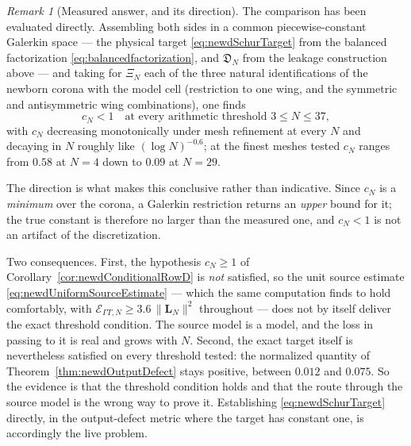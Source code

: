 \documentclass[11pt]{amsart}
\theoremstyle{definition}
\theoremstyle{remark}
\newtheorem{remark}[theorem]{Remark}
\begin{document}
\begin{remark}[Measured answer, and its direction]
\label{rem:newdTransferMeasured}
The comparison has been evaluated directly.  Assembling both sides in a common
piecewise-constant Galerkin space --- the physical target
\eqref{eq:newdSchurTarget} from the balanced factorization
\eqref{eq:balancedfactorization}, and \(\mathfrak D_N\) from the leakage
construction above --- and taking for \(\Xi_N\) each of the three natural
identifications of the newborn corona with the model cell (restriction to one
wing, and the symmetric and antisymmetric wing combinations), one finds
\[
 c_N<1\quad\text{at every arithmetic threshold }3\le N\le37,
\]
with \(c_N\) decreasing monotonically under mesh refinement at every \(N\) and
decaying in \(N\) roughly like \((\log N)^{-0.6}\); at the finest meshes tested
\(c_N\) ranges from \(0.58\) at \(N=4\) down to \(0.09\) at \(N=29\).

The direction is what makes this conclusive rather than indicative.  Since
\(c_N\) is a \emph{minimum} over the corona, a Galerkin restriction returns an
\emph{upper} bound for it; the true constant is therefore no larger than the
measured one, and \(c_N<1\) is not an artifact of the discretization.

Two consequences.  First, the hypothesis \(c_N\ge1\) of
Corollary~\ref{cor:newdConditionalRowD} is \emph{not} satisfied, so the unit
source estimate \eqref{eq:newdUniformSourceEstimate} --- which the same
computation finds to hold comfortably, with
\(\mathcal E_{\Gamma T,N}\ge3.6\,\|\mathbf L_N\|^2\) throughout --- does not by
itself deliver the exact threshold condition.  The source model is a model,
and the loss in passing to it is real and grows with \(N\).  Second, the exact
target itself is nevertheless satisfied on every threshold tested: the
normalized quantity of Theorem~\ref{thm:newdOutputDefect} stays positive,
between \(0.012\) and \(0.075\).  So the evidence is that the threshold
condition holds and that the route through the source model is the wrong way
to prove it.  Establishing \eqref{eq:newdSchurTarget} directly, in the
output-defect metric where the target has constant one, is accordingly the
live problem.
\end{remark}
\end{document}
